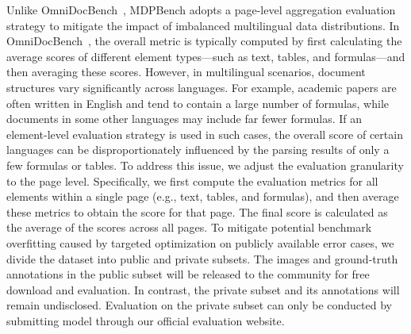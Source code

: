 \documentclass[runningheads]{llncs}
\begin{document}
Unlike OmniDocBench~\cite{omnidocbench}, MDPBench adopts a page-level aggregation evaluation strategy to mitigate the impact of imbalanced multilingual data distributions. In OmniDocBench~\cite{omnidocbench}, the overall metric is typically computed by first calculating the average scores of different element types—such as text, tables, and formulas—and then averaging these scores. However, in multilingual scenarios, document structures vary significantly across languages. For example, academic papers are often written in English and tend to contain a large number of formulas, while documents in some other languages may include far fewer formulas. If an element-level evaluation strategy is used in such cases, the overall score of certain languages can be disproportionately influenced by the parsing results of only a few formulas or tables. To address this issue, we adjust the evaluation granularity to the page level. Specifically, we first compute the evaluation metrics for all elements within a single page (e.g., text, tables, and formulas), and then average these metrics to obtain the score for that page. The final score is calculated as the average of the scores across all pages. To mitigate potential benchmark overfitting caused by targeted optimization on publicly available error cases, we divide the dataset into public and private subsets. The images and ground-truth annotations in the public subset will be released to the community for free download and evaluation. In contrast, the private subset and its annotations will remain undisclosed. Evaluation on the private subset can only be conducted by submitting model through our official evaluation website.
\end{document}
